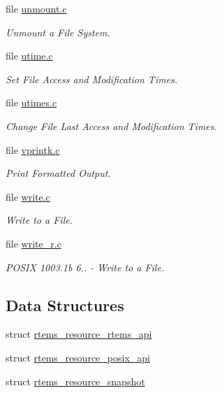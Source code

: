 \begin{DoxyCompactItemize}
file \mbox{\hyperlink{unmount_8c}{unmount.\+c}}
\begin{DoxyCompactList}\small\item\em Unmount a File System. \end{DoxyCompactList}\item 
file \mbox{\hyperlink{utime_8c}{utime.\+c}}
\begin{DoxyCompactList}\small\item\em Set File Access and Modification Times. \end{DoxyCompactList}\item 
file \mbox{\hyperlink{utimes_8c}{utimes.\+c}}
\begin{DoxyCompactList}\small\item\em Change File Last Access and Modification Times. \end{DoxyCompactList}\item 
file \mbox{\hyperlink{vprintk_8c}{vprintk.\+c}}
\begin{DoxyCompactList}\small\item\em Print Formatted Output. \end{DoxyCompactList}\item 
file \mbox{\hyperlink{libcsupport_2src_2write_8c}{write.\+c}}
\begin{DoxyCompactList}\small\item\em Write to a File. \end{DoxyCompactList}\item 
file \mbox{\hyperlink{write__r_8c}{write\+\_\+r.\+c}}
\begin{DoxyCompactList}\small\item\em P\+O\+S\+IX 1003.\+1b 6.. -\/ Write to a File. \end{DoxyCompactList}\end{DoxyCompactItemize}
\subsection*{Data Structures}
\begin{DoxyCompactItemize}
\item 
struct \mbox{\hyperlink{structrtems__resource__rtems__api}{rtems\+\_\+resource\+\_\+rtems\+\_\+api}}
\item 
struct \mbox{\hyperlink{structrtems__resource__posix__api}{rtems\+\_\+resource\+\_\+posix\+\_\+api}}
\item 
struct \mbox{\hyperlink{structrtems__resource__snapshot}{rtems\+\_\+resource\+\_\+snapshot}}
\end{DoxyCompactItemize}
